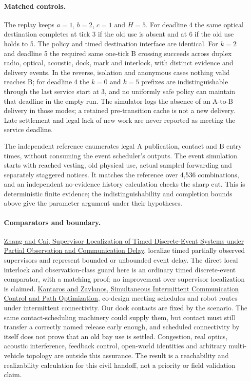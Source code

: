 \documentclass[11pt]{article}
\begin{document}
\paragraph{Matched controls.}
The replay keeps $a=1$, $b=2$, $c=1$ and $H=5$. For deadline 4 the same optical destination completes at tick 3 if the old use is absent and at 6 if the old use holds to 5. The policy and timed destination interface are identical. For $k=2$ and deadline 5 the required same one-tick B crossing succeeds across duplex radio, optical, acoustic, dock, mark and interlock, with distinct evidence and delivery events. In the reverse, isolation and anonymous cases nothing valid reaches B; for deadline 4 the $k=0$ and $k=5$ prefixes are indistinguishable through the last service start at 3, and no uniformly safe policy can maintain that deadline in the empty run. The simulator logs the absence of an A-to-B delivery in those modes; a retained pre-transition cache is not a new delivery. Late settlement and legal lack of new work are never reported as meeting the service deadline.

The independent reference enumerates legal A publication, contact and B entry times, without consuming the event scheduler's outputs. The event simulation starts with reached vesting, old physical use, actual sampled forwarding and separately staggered notices. It matches the reference over 4,536 combinations, and an independent no-evidence history calculation checks the sharp cut. This is deterministic finite evidence; the indistinguishability and completion bounds above give the parameter argument under their hypotheses.

\paragraph{Comparators and boundary.}
\href{https://arxiv.org/abs/1603.02023}{Zhang and Cai, Supervisor Localization of Timed Discrete-Event Systems under Partial Observation and Communication Delay}, localize timed partially observed supervisors and represent bounded or unbounded event delay. The direct local interlock and observation-class guard here is an ordinary timed discrete-event comparator, with a matching proof; no improvement over supervisor localization is claimed. \href{https://arxiv.org/abs/1609.07038}{Kantaros and Zavlanos, Simultaneous Intermittent Communication Control and Path Optimization}, co-design meeting schedules and robot routes under intermittent connectivity. Our dock contacts are fixed by the scenario. The same contact-scheduling machinery could supply them, but contact must still transfer a correctly named release early enough, and scheduled connectivity by itself does not prove that an old bay use is settled. Congestion, real optics, acoustic interference, feedback control, open-world identities and arbitrary multi-vehicle topology are outside this assurance. The result is a reachability and realizability calculation for this civil handoff, not a priority or field validation claim.
\end{document}
